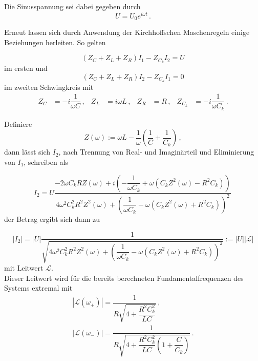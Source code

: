 Die Sinusspannung sei dabei gegeben durch
\begin{equation*}
    U = U_0 e^{iωt}\,.
\end{equation*}

Erneut lassen sich durch Anwendung der Kirchhoffschen Maschenregeln einige Beziehungen herleiten. So gelten

\begin{equation}
    (Z_C + Z_L + Z_R)I_1 - Z_{C_k}I_2 = U
\end{equation}
im ersten und
\begin{equation}
    (Z_C + Z_L + Z_R)I_2 -Z_{C_k}I_1 = 0
\end{equation}
im zweiten Schwingkreis mit 
\begin{align*}
    Z_C     &= -i\dfrac{1}{ωC}\,,   &  Z_L     &= iωL\,,  &   Z_R     &= R\,,   &    Z_{C_k} &= -i\dfrac{1}{ω C_k}\,.
\end{align*}

\newpage

Definiere
\begin{equation*}
    Z(ω) := ωL - \dfrac{1}{ω}\left(\dfrac{1}{C} + \dfrac{1}{C_k}\right)\,,
\end{equation*} dann lässt sich $I_2$, nach Trennung von Real- und Imaginärteil und Eliminierung von $I_1$, schreiben als

\begin{equation}
    I_2 = U \dfrac{-2 ω C_k R Z(ω) + i \left(-\dfrac{1}{ωC_k} + ω (C_k Z^2(ω) -  R^2 C_k) \right)}{4 ω^2 C^2_k R^2 Z^2(ω) + \left(\dfrac{1}{ω C_k} - ω (C_k Z^2(ω) +  R^2 C_k) \right)^2}\,
\end{equation} der Betrag ergibt sich dann zu

\begin{equation}
    |I_2| = |U| \dfrac{1}{\sqrt{4 ω^2 C^2_k R^2 Z^2(ω) + \left(\dfrac{1}{ω C_k} - ω (C_k Z^2(ω) +  R^2 C_k) \right)^2}} := |U||\mathcal{L}|
\end{equation} mit Leitwert $\mathcal{L}$.\\

Dieser Leitwert wird für die bereits berechneten Fundamentalfrequenzen des Systems extremal mit
\begin{align}
    |\mathcal{L}(ω_+)| = \dfrac{1}{R \sqrt{4+ \dfrac{R^2 C^2_k}{L C}}} \label{eq:Lomega+}\,, \\
    |\mathcal{L}(ω_-)| = \dfrac{1}{R \sqrt{4+ \dfrac{R^2 C^2_k}{L C} \left(1 + \dfrac{C}{C_k}\right)}} \label{eq:Lomega-}\,.
\end{align}

